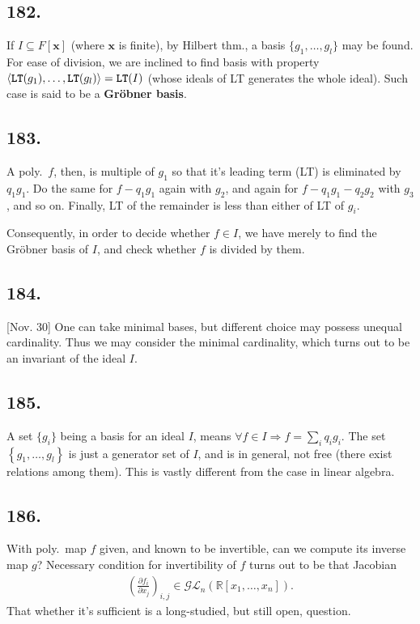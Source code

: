 \documentclass[12pt]{article}
\newcommand\F\frac%
\newcommand\Pt\partial%
\newcommand\V\mathbf%
\newcommand\Ev\forall%
\newcommand{\Ip}{\Rightarrow} %
\newcommand{\Rb}[1]{ \left( #1 \right) }%
\newcommand{\Cb}[1]{ \left\{ #1 \right\} }%
\newcommand{\Ab}[1]{ \left\langle #1 \right\rangle } %
\newcommand{\BF}[1]{ \mathbb{#1} }%
\newcommand{\CF}[1]{ \mathcal{#1} }%
\newcommand{\Ss}[1]{\textsf{\bfseries{#1}}}%
\newcommand{\Tw}[1]{\texttt{\bfseries{#1}}}%
\newcommand{\EqGo}[1]{ \begin{gather*}{#1}\end{gather*} } %
\begin{document}
\subsection*{182.} If \(I \subseteq F[\V{x}]\) (where \(\V{x}\) is finite), by Hilbert thm., a basis \(\{g_1,\dotsc,g_l\}\) may be found. 
For ease of division, we are inclined to find basis with property \(\Ab{\Tw{LT}(g_1),\dotsc,\Tw{LT}(g_l)} =\Tw{LT}(I)\) (whose ideals of LT generates the whole ideal). 
Such case is said to be a \Ss{Gr\"obner basis}. 

\subsection*{183.} A poly.\ \(f\), then, is multiple of \(g_1\) so that it's leading term (LT) is eliminated by \(q_1 g_1\). 
Do the same for \(f -q_1 g_1\) again with \(g_2\), and again for \(f -q_1 g_1 -q_2 g_2\) with \(g_3\), and so on. 
Finally, LT of the remainder is less than either of LT of \(g_i\). \par
Consequently, in order to decide whether \(f \in I\), we have merely to find the Gr\"obner basis of \(I\), and check whether \(f\) is divided by them.

\subsection*{184.} [Nov. 30] One can take minimal bases, but different choice may possess unequal cardinality. 
Thus we may consider the minimal cardinality, which turns out to be an invariant of the ideal \(I\). 

\subsection*{185.} A set \(\{g_i\}\) being a basis for an ideal \(I\), means \(\Ev f \in I \Ip f = \sum_i q_i g_i\). 
The set \(\Cb{g_1,\dotsc,g_l}\) is just a generator set of \(I\), and is in general, not free (there exist relations among them). 
This is vastly different from the case in linear algebra. 

\subsection*{186.} With poly.\ map \(f\) given, and known to be invertible, can we compute its inverse map \(g\)? 
Necessary condition for invertibility of \(f\) turns out to be that Jacobian \EqGo{
 \Rb{\F{\Pt f_i}{\Pt x_j}}_{i,j} \in \CF{GL}_n(\BF{R}[x_1,\dotsc,x_n]).
} That whether it's sufficient is a long-studied, but still open, question. 
\end{document}
